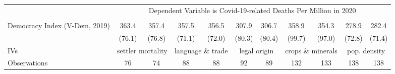 {\begin{tabular}{l*{10}{c}}
& \multicolumn{10}{c}{Dependent Variable is Covid-19-related Deaths Per Million in 2020} \\\cline{2-11}\\[-1.8ex]
Democracy Index (V-Dem, 2019)&       363.4\sym{***}&       357.4\sym{***}&       357.5\sym{***}&       356.5\sym{***}&       307.9\sym{***}&       306.7\sym{***}&       358.9\sym{***}&       354.3\sym{***}&       278.9\sym{***}&       282.4\sym{***}\\
&      (76.1)         &      (76.8)         &      (71.1)         &      (72.0)         &      (80.3)         &      (80.4)         &      (99.7)         &      (97.0)         &      (72.8)         &      (71.4)         \\
IVs & \multicolumn{2}{c}{settler mortality} & \multicolumn{2}{c}{language \& trade} & \multicolumn{2}{c}{legal origin} &  \multicolumn{2}{c}{crops \& minerals} &  \multicolumn{2}{c}{pop. density} \\
Observations        &          76         &          74         &          88         &          88         &          92         &          89         &         132         &         133         &         138         &         138         \\
\hline\hline
\end{tabular}
}
